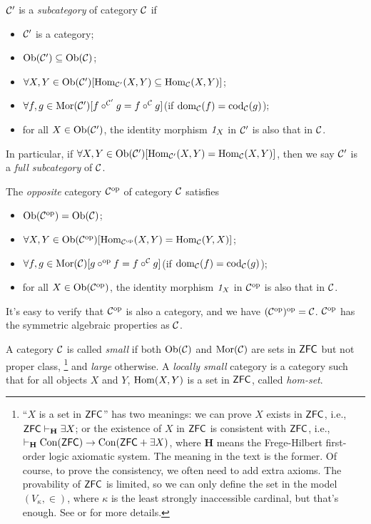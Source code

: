 \documentclass{article}
\begin{document}
\begin{defi}\label{subcategory, opposite category, small category}
	$\mathcal{C}'$ is a \emph{subcategory} of category $\mathcal{C}$ if
	\begin{itemize}
		\item $\mathcal{C}'$ is a category;
		\item $\mathrm{Ob}(\mathcal{C}')\subseteq\mathrm{Ob}(\mathcal{C})$;
		\item $\forall X,Y\in\mathrm{Ob}(\mathcal{C}')[\mathrm{Hom}_{\mathcal{C}'}(X,Y)\subseteq\mathrm{Hom}_{\mathcal{C}}(X,Y)]$;
		\item $\forall f,g\in\mathrm{Mor}(\mathcal{C}')[f\circ^{\mathcal{C}'}g=f\circ^{\mathcal{C}}g]$\quad(if $\mathrm{dom}_{\mathcal{C}}(f)=\mathrm{cod}_{\mathcal{C}}(g)$);
		\item for all $X\in\mathrm{Ob}(\mathcal{C}')$, the identity morphism $\mathit{1}_X$ in $\mathcal{C}'$ is also that in $\mathcal{C}$.
	\end{itemize}
	In particular, if $\forall X,Y\in\mathrm{Ob}(\mathcal{C}')[\mathrm{Hom}_{\mathcal{C}'}(X,Y)=\mathrm{Hom}_{\mathcal{C}}(X,Y)]$, then we say 	$\mathcal{C}'$ is a \emph{full subcategory} of $\mathcal{C}$.
	
	The \emph{opposite} category $\mathcal{C}^\mathrm{op}$ of category $\mathcal{C}$ satisfies
	\begin{itemize}
		\item $\mathrm{Ob}(\mathcal{C}^\mathrm{op})=\mathrm{Ob}(\mathcal{C})$;
		\item $\forall X,Y\in\mathrm{Ob}(\mathcal{C}^\mathrm{op})[\mathrm{Hom}_{\mathcal{C}^\mathrm{op}}(X,Y)=\mathrm{Hom}_{\mathcal{C}}(Y,X)]$;
		\item $\forall f,g\in\mathrm{Mor}(\mathcal{C})[g\circ^\mathrm{op} f=f\circ^{\mathcal{C}} g]$\quad(if $\mathrm{dom}_{\mathcal{C}}(f)=\mathrm{cod}_{\mathcal{C}}(g)$);
		\item for all $X\in\mathrm{Ob}(\mathcal{C}^\mathrm{op})$, the identity morphism $\mathit{1}_X$ in $\mathcal{C}^\mathrm{op}$ is also that in $\mathcal{C}$.
	\end{itemize}
	It's easy to verify that $\mathcal{C}^\mathrm{op}$ is also a category, and we have $(\mathcal{C}^\mathrm{op})^\mathrm{op}=\mathcal{C}$. $\mathcal{C}^\mathrm{op}$ has the symmetric algebraic properties as $\mathcal{C}$.
	
	A category $\mathcal{C}$ is called \emph{small} if both $\mathrm{Ob}(\mathcal{C})$ and $\mathrm{Mor}(\mathcal{C})$ are sets in $\mathsf{ZFC}$ but not proper class,
	 \footnote{``$X$ is a set in $\mathsf{ZFC}$'' has two meanings: we can prove $X$ exists in $\mathsf{ZFC}$, i.e., $\mathsf{ZFC}\vdash_\mathbf{H}\exists X$; or the existence of $X$ in $\mathsf{ZFC}$ is consistent with $\mathsf{ZFC}$, i.e., $\vdash_\mathbf{H}\mathrm{\mathrm{Con}}(\mathsf{ZFC})\to\mathrm{Con}(\mathsf{ZFC}+\exists X)$, where $\mathbf{H}$ means the Frege-Hilbert first-order logic axiomatic system. The meaning in the text is the former. Of course, to prove the consistency, we often need to add extra axioms. The provability of $\mathsf{ZFC}$ is limited, so we can only define the set in the model $(V_\kappa,\in)$, where $\kappa$ is the least strongly inaccessible cardinal, but that's enough. See \cite{set-1} or \cite{mod-1} for more details.}
	and \emph{large} otherwise. A \emph{locally small} category is a category such that for all objects $X$ and $Y$, $\mathrm{Hom}(X,Y)$ is a set in $\mathsf{ZFC}$, called \emph{hom-set}.
\end{defi}
\end{document}
